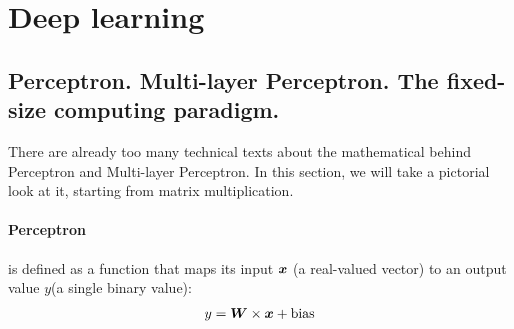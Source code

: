 \section{Deep learning}
\subsection{Perceptron. Multi-layer Perceptron. The fixed-size computing paradigm.}
There are already too many technical texts about the mathematical behind Perceptron and Multi-layer Perceptron. In this section, we will take a pictorial look at it, starting from matrix multiplication.

\paragraph{Perceptron} is defined as a function that maps its input $\boldsymbol{x}$
(a real-valued vector) to an output value $y$(a single binary value):
\begin{align}
  y = \boldsymbol{W} \times \boldsymbol{x} + \text{bias}
\end{align}

